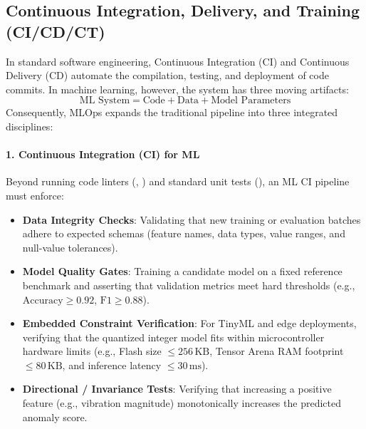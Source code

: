 \subsection{Continuous Integration, Delivery, and Training (CI/CD/CT)}\label{subsec:cicd_ml}

In standard software engineering, Continuous Integration (CI) and Continuous Delivery (CD) automate the compilation, testing, and deployment of code commits. In machine learning, however, the system has three moving artifacts:
\begin{equation}
\text{ML System} = \text{Code} + \text{Data} + \text{Model Parameters}
\end{equation}
Consequently, MLOps expands the traditional pipeline into three integrated disciplines:

\paragraph{1. Continuous Integration (CI) for ML}
Beyond running code linters (, ) and standard unit tests (), an ML CI pipeline must enforce:
\begin{itemize}
    \item \textbf{Data Integrity Checks}: Validating that new training or evaluation batches adhere to expected schemas (feature names, data types, value ranges, and null-value tolerances).
    \item \textbf{Model Quality Gates}: Training a candidate model on a fixed reference benchmark and asserting that validation metrics meet hard thresholds (e.g., $\text{Accuracy} \ge 0.92$, $\text{F1} \ge 0.88$).
    \item \textbf{Embedded Constraint Verification}: For TinyML and edge deployments, verifying that the quantized integer model fits within microcontroller hardware limits (e.g., Flash size $\le 256\,\text{KB}$, Tensor Arena RAM footprint $\le 80\,\text{KB}$, and inference latency $\le 30\,\text{ms}$).
    \item \textbf{Directional / Invariance Tests}: Verifying that increasing a positive feature (e.g., vibration magnitude) monotonically increases the predicted anomaly score.
\end{itemize}

